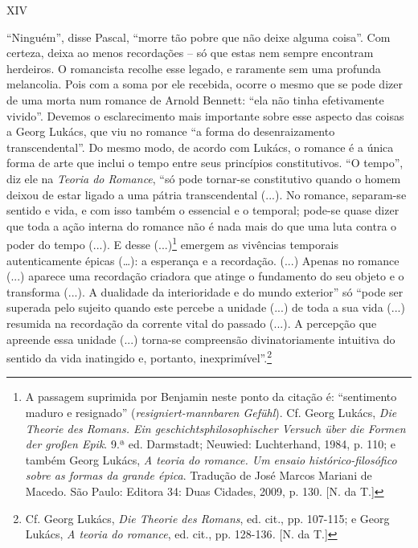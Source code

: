 XIV

``Ninguém'', disse Pascal, ``morre tão pobre que não deixe alguma
coisa''. Com certeza, deixa ao menos recordações -- só que estas nem
sempre encontram herdeiros. O romancista recolhe esse legado, e
raramente sem uma profunda melancolia. Pois com a soma por ele recebida,
ocorre o mesmo que se pode dizer de uma morta num romance de Arnold
Bennett: ``ela não tinha efetivamente vivido''. Devemos o esclarecimento
mais importante sobre esse aspecto das coisas a Georg Lukács, que viu no
romance ``a forma do desenraizamento transcendental''. Do mesmo modo, de
acordo com Lukács, o romance é a única forma de arte que inclui o tempo
entre seus princípios constitutivos. ``O tempo'', diz ele na
\emph{Teoria do Romance}, ``só pode tornar-se constitutivo quando o
homem deixou de estar ligado a uma pátria transcendental (...). No
romance, separam-se sentido e vida, e com isso também o essencial e o
temporal; pode-se quase dizer que toda a ação interna do romance não é
nada mais do que uma luta contra o poder do tempo (...). E desse
(...)\footnote{A passagem suprimida por Benjamin neste ponto da citação
  é: ``sentimento maduro e resignado'' (\emph{resigniert-mannbaren
  Gefühl}). Cf. Georg Lukács, \emph{Die Theorie des Romans. Ein
  geschichtsphilosophischer Versuch über die Formen der großen Epik}.
  9.ª ed. Darmstadt; Neuwied: Luchterhand, 1984, p. 110; e também Georg
  Lukács, \emph{A teoria do romance. Um ensaio histórico-filosófico
  sobre as formas da grande épica}. Tradução de José Marcos Mariani de
  Macedo. São Paulo: Editora 34: Duas Cidades, 2009, p. 130. {[}N. da
  T.{]}} emergem as vivências temporais autenticamente épicas
(\ldots{}): a esperança e a recordação. (...) Apenas no romance (...)
aparece uma recordação criadora que atinge o fundamento do seu objeto e
o transforma (...). A dualidade da interioridade e do mundo exterior''
só ``pode ser superada pelo sujeito quando este percebe a unidade (...)
de toda a sua vida (...) resumida na recordação da corrente vital do
passado (...). A percepção que apreende essa unidade (...) torna-se
compreensão divinatoriamente intuitiva do sentido da vida inatingido e,
portanto, inexprimível''.\footnote{Cf. Georg Lukács, \emph{Die Theorie
  des Romans}, ed. cit., pp. 107-115; e Georg Lukács, \emph{A teoria do
  romance}, ed. cit., pp. 128-136\emph{.} {[}N. da T.{]}}

